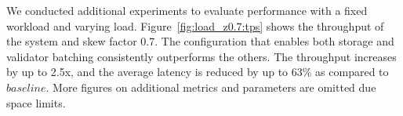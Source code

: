 We conducted additional experiments to evaluate performance with a fixed workload and varying load. Figure~\ref{fig:load_z0.7:tps} shows the throughput of the system and skew factor 0.7. The configuration that enables both storage and validator batching consistently outperforms the others. The throughput increases by up to 2.5x, and the average latency is reduced by up to 63\% as compared to $baseline$. More figures on additional metrics and parameters are omitted due space limits.

